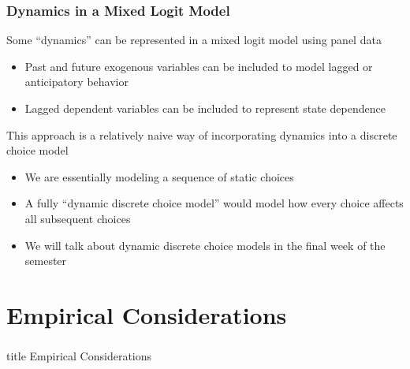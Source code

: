 \documentclass{beamer}
\begin{document}
\begin{frame}\frametitle{Dynamics in a Mixed Logit Model}
    Some ``dynamics'' can be represented in a mixed logit model using panel data
    \begin{itemize}
        \item Past and future exogenous variables can be included to model lagged or anticipatory behavior
        \item Lagged dependent variables can be included to represent state dependence 
    \end{itemize}
    \vspace{3ex}
    This approach is a relatively naive way of incorporating dynamics into a discrete choice model
    \begin{itemize}
        \item We are essentially modeling a sequence of static choices
        \item A fully ``dynamic discrete choice model'' would model how every choice affects all subsequent choices
        \item We will talk about dynamic discrete choice models in the final week of the semester
    \end{itemize}
\end{frame}

\section{Empirical Considerations}
\label{empirical}
\begin{frame}\frametitle{}
    \vfill
    \centering 
    \begin{beamercolorbox}[center]{title}
        \Large Empirical Considerations
    \end{beamercolorbox}
    \vfill
\end{frame}
\end{document}
